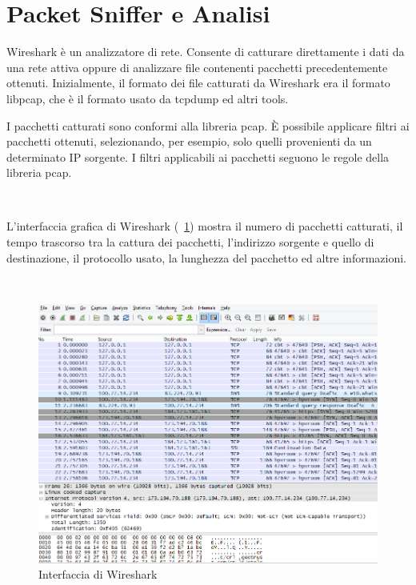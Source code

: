 \documentclass[a4paper,11pt]{book}
\begin{document}
\clearpage

\section{Packet Sniffer e Analisi}

Wireshark \cite{rif5} \`e un analizzatore di rete. Consente di catturare direttamente i dati da una rete attiva oppure di analizzare file contenenti pacchetti precedentemente ottenuti. Inizialmente, il formato dei file catturati da Wireshark era il formato libpcap, che \`e il formato usato da tcpdump ed altri tools.

I pacchetti catturati sono conformi alla libreria pcap. \`E possibile applicare filtri ai pacchetti ottenuti, selezionando, per esempio, solo quelli provenienti da un determinato IP sorgente. I filtri applicabili ai pacchetti seguono le regole della libreria pcap.

~

L'interfaccia grafica di Wireshark (\figurename ~\ref{fig:Whireshark}) mostra il numero di pacchetti catturati, il tempo trascorso tra la cattura dei pacchetti, l'indirizzo sorgente e quello di destinazione, il protocollo usato, la lunghezza del pacchetto ed altre informazioni.

~

\begin{figure}[!ht]
\centering
\includegraphics[scale = 0.6]{Whireshark}
\caption{Interfaccia di Wireshark}
\label{fig:Whireshark}
\end{figure}

\clearpage
\end{document}
